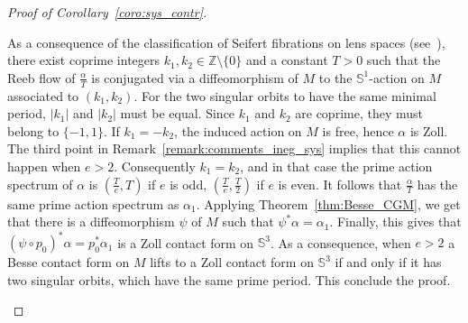 \documentclass[AHL,Unicode,longabstracts]{cedram}
\newcommand{\bbS}{\mathbb{S}}
\newcommand{\bbZ}{\mathbb{Z}}
\newcommand{\bbS}{\mathbb{S}}
\begin{document}
\begin{proof}[{Proof of Corollary~\ref{coro:sys_contr}}]
\begin{itemize}
As a consequence of the classification of Seifert fibrations on lens spaces (see~\cite[Theorem~5.1]{Geiges2018}), there exist coprime integers $k_1, k_2 \in \bbZ \setminus \{0\}$ and a constant $T > 0$ such that the Reeb flow of $\frac{\alpha}{T}$ is conjugated via a diffeomorphism of $M$ to the $\bbS^1$-action on $M$ associated to $(k_1,k_2)$. For the two singular orbits to have the same minimal period, $|k_1|$ and $|k_2|$ must be equal. Since $k_1$ and $k_2$ are coprime, they must belong to $\{-1,1\}$. If $k_1 = -k_2$, the induced action on $M$ is free, hence $\alpha$ is Zoll. The third point in Remark~\ref{remark:comments_ineg_sys} implies that this cannot happen when $e>2$. Consequently $k_1 = k_2$, and in that case the prime action spectrum of $\alpha$ is $(\frac{T}{e}, T)$ if $e$ is odd, $(\frac{T}{e}, \frac{T}{2})$ if $e$ is even. It follows that $\frac{\alpha}{T}$ has the same prime action spectrum as $\alpha_1$. Applying Theorem~\ref{thm:Besse_CGM}, we get that there is a diffeomorphism $\psi$ of $M$ such that $\psi^*\alpha=\alpha_1$. Finally, this gives that $(\psi \circ p_0)^* \alpha = p_0^* \alpha_1$ is a Zoll contact form on $\bbS^3$. As a consequence, when $e> 2$ a Besse contact form on $M$ lifts to a Zoll contact form on $\bbS^3$ if and only if it has two singular orbits, which have the same prime period. This conclude the proof.\qedhere
\end{itemize}\let\qed\relax
\end{proof}

\let\OLDthebibliography\thebibliography
\renewcommand\thebibliography[1]{
\OLDthebibliography{#1}
\setlength{\parskip}{0pt}
\setlength{\itemsep}{7pt plus 0.3ex}}


\end{document}
